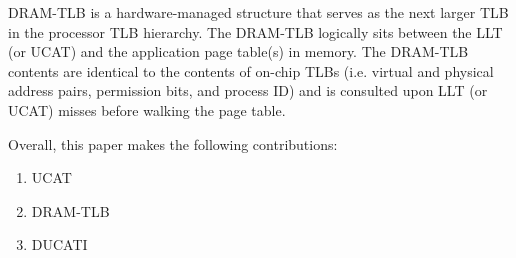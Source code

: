 DRAM-TLB is a hardware-managed structure that serves as the next
larger TLB in the processor TLB hierarchy. The DRAM-TLB logically sits
between the LLT (or UCAT) and the application page table(s) in memory. The
DRAM-TLB contents are identical to the contents of on-chip TLBs (i.e.
virtual and physical address pairs, permission bits, and process ID)
and is consulted upon LLT (or UCAT) misses before walking the page table.


Overall, this paper makes the following contributions:

\begin{enumerate}

\item{UCAT}
\item{DRAM-TLB}
\item{DUCATI}








\end{enumerate}
